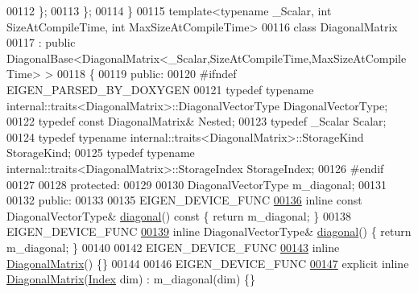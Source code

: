 \begin{DoxyCode}
00112   \};
00113 \};
00114 \}
00115 \textcolor{keyword}{template}<\textcolor{keyword}{typename} \_Scalar, \textcolor{keywordtype}{int} SizeAtCompileTime, \textcolor{keywordtype}{int} MaxSizeAtCompileTime>
00116 \textcolor{keyword}{class }DiagonalMatrix
00117   : \textcolor{keyword}{public} DiagonalBase<DiagonalMatrix<\_Scalar,SizeAtCompileTime,MaxSizeAtCompileTime> >
00118 \{
00119   \textcolor{keyword}{public}:
00120 \textcolor{preprocessor}{    #ifndef EIGEN\_PARSED\_BY\_DOXYGEN}
00121     \textcolor{keyword}{typedef} \textcolor{keyword}{typename} internal::traits<DiagonalMatrix>::DiagonalVectorType DiagonalVectorType;
00122     \textcolor{keyword}{typedef} \textcolor{keyword}{const} DiagonalMatrix& Nested;
00123     \textcolor{keyword}{typedef} \_Scalar Scalar;
00124     \textcolor{keyword}{typedef} \textcolor{keyword}{typename} internal::traits<DiagonalMatrix>::StorageKind StorageKind;
00125     \textcolor{keyword}{typedef} \textcolor{keyword}{typename} internal::traits<DiagonalMatrix>::StorageIndex StorageIndex;
00126 \textcolor{preprocessor}{    #endif}
00127 
00128   \textcolor{keyword}{protected}:
00129 
00130     DiagonalVectorType m\_diagonal;
00131 
00132   \textcolor{keyword}{public}:
00133 
00135     EIGEN\_DEVICE\_FUNC
\hyperlink{group___core___module_aa17bf78369fc6f541056b5b5a696f73b}{00136}     \textcolor{keyword}{inline} \textcolor{keyword}{const} DiagonalVectorType& \hyperlink{group___core___module_aa17bf78369fc6f541056b5b5a696f73b}{diagonal}()\textcolor{keyword}{ const }\{ \textcolor{keywordflow}{return} m\_diagonal; \}
00138     EIGEN\_DEVICE\_FUNC
\hyperlink{group___core___module_aea4c301c837d0af2fdab5d7d1f32c97d}{00139}     \textcolor{keyword}{inline} DiagonalVectorType& \hyperlink{group___core___module_aea4c301c837d0af2fdab5d7d1f32c97d}{diagonal}() \{ \textcolor{keywordflow}{return} m\_diagonal; \}
00140 
00142     EIGEN\_DEVICE\_FUNC
\hyperlink{group___core___module_a828c0f7d55a4f66908e76b3af1acc37f}{00143}     \textcolor{keyword}{inline} \hyperlink{group___core___module_a828c0f7d55a4f66908e76b3af1acc37f}{DiagonalMatrix}() \{\}
00144 
00146     EIGEN\_DEVICE\_FUNC
\hyperlink{group___core___module_a82e6fd9b8f7f614bc05b4f941a875d7a}{00147}     \textcolor{keyword}{explicit} \textcolor{keyword}{inline} \hyperlink{group___core___module_a82e6fd9b8f7f614bc05b4f941a875d7a}{DiagonalMatrix}(\hyperlink{group___core___module_a554f30542cc2316add4b1ea0a492ff02}{Index} dim) : m\_diagonal(dim) \{\}

\end{DoxyCode}
